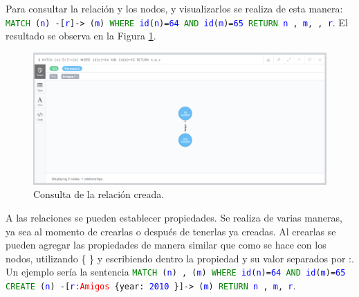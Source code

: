 \documentclass[conference]{IEEEtran}
\begin{document}
Para consultar la relación y los nodos, y visualizarlos se realiza de esta manera: \texttt{\textcolor{green}{MATCH} (\textcolor{blue}{n}) -[\textcolor{blue}{r}]-> (\textcolor{blue}{m}) \textcolor{green}{WHERE} \textcolor{blue}{id}(\textcolor{blue}{n})=\textcolor{blue}{64} \textcolor{green}{AND} \textcolor{blue}{id}(\textcolor{blue}{m})=\textcolor{blue}{65}  \textcolor{green}{RETURN} \textcolor{blue}{n} , \textcolor{blue}{m}, , \textcolor{blue}{r}}. El resultado se observa en la Figura \ref{fig35}.

\begin{figure}[H]
\begin{center}
\includegraphics[width= 0.45 \textwidth]{relation_query1.png}
\end{center}
\caption{Consulta de la relación creada.}
\label{fig35}
\end{figure}

A las relaciones se pueden establecer propiedades. Se realiza de varias maneras, ya sea al momento de crearlas o después de tenerlas ya creadas. Al crearlas se pueden agregar las propiedades de manera similar que como se hace con los nodos, utilizando \{ \} y escribiendo dentro la propiedad y su valor separados por :. Un ejemplo sería la sentencia  \texttt{\textcolor{green}{MATCH} (\textcolor{blue}{n}) , (\textcolor{blue}{m}) \textcolor{green}{WHERE} \textcolor{blue}{id}(\textcolor{blue}{n})=\textcolor{blue}{64} \textcolor{green}{AND} \textcolor{blue}{id}(\textcolor{blue}{m})=\textcolor{blue}{65} \textcolor{green}{CREATE} (\textcolor{blue}{n}) -[\textcolor{blue}{r}\textcolor{red}{:Amigos} \{year: \textcolor{blue}{2010}  \}]-> (\textcolor{blue}{m}) \textcolor{green}{RETURN} \textcolor{blue}{n} , \textcolor{blue}{m}, \textcolor{blue}{r}}.
\\
\end{document}
